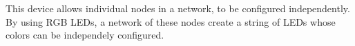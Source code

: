 
This device allows individual nodes in a network, to be configured independently. By using RGB LEDs, a network of these nodes create a string of LEDs whose colors can be independely configured.
